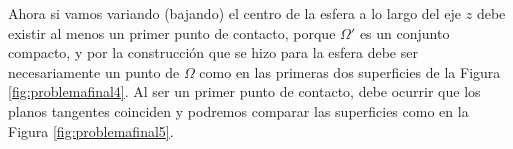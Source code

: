 \documentclass[oneside,11pt]{memoir}
\begin{document}
Ahora si vamos variando (bajando) el centro de la esfera a lo largo del eje $z$ debe existir al menos un primer punto de contacto, porque $\Omega'$ es un conjunto compacto, y por la construcción que se hizo para la esfera debe ser necesariamente un punto de $\Omega$ como en las primeras dos superficies de la Figura \ref{fig:problemafinal4}. Al ser un primer punto de contacto, debe ocurrir que los planos tangentes coinciden y podremos comparar las superficies como en la Figura \ref{fig:problemafinal5}.
\begin{figure}[h]
    \begin{center}
      

\begin{tikzpicture}[x=0.7pt,y=0.7pt,yscale=-1,xscale=1]


\end{tikzpicture}
\end{center}
\end{figure}
\end{document}
